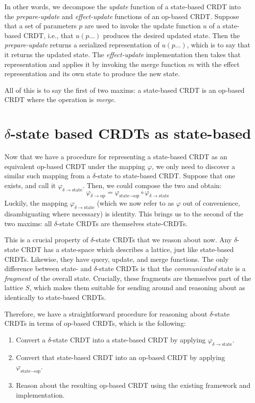 In other words, we decompose the \textit{update} function of a state-based CRDT
into the \textit{prepare-update} and \textit{effect-update} functions of an
op-based CRDT. Suppose that a set of parameters $p$ are used to invoke the
update function $u$ of a state-based CRDT, i.e., that $u(p...)$ produces the
desired updated state. Then the \textit{prepare-update} returns a serialized
representation of $u(p...)$, which is to say that it returns the updated state.
The \textit{effect-update} implementation then takes that representation and
applies it by invoking the merge function $m$ with the effect representation and
its own state to produce the new state.

All of this is to say the first of two maxims: a state-based CRDT is an op-based
CRDT where the operation is \emph{merge}.

\section{$\delta$-state based CRDTs as state-based}
Now that we have a procedure for representing a state-based CRDT as an
equivalent op-based CRDT under the mapping $\varphi$, we only need to discover a
similar such mapping from a $\delta$-state to state-based CRDT. Suppose that one
exists, and call it $\varphi_{\delta \to \text{state}}$. Then, we could compose
the two and obtain:
\[
  \varphi_{\delta \to \text{op}} =
    \varphi_{\text{state} \to \text{op}} \circ
    \varphi_{\delta \to \text{state}}
\]
Luckily, the mapping $\varphi_{\delta \to \text{state}}$ (which we now refer to
as $\varphi$ out of convenience, disambiguating where necessary) is identity.
This brings us to the second of the two maxims: all $\delta$-state CRDTs are
themselves state-CRDTs.

This is a crucial property of $\delta$-state CRDTs that we reason about now. Any
$\delta$-state CRDT has a state-space which describes a lattice, just like
state-based CRDTs. Likewise, they have query, update, and merge functions. The
only difference between state- and $\delta$-state CRDTs is that the
\emph{communicated} state is a \emph{fragment} of the overall state. Crucially,
these fragments are themselves part of the lattice $S$, which makes them
suitable for sending around and reasoning about as identically to state-based
CRDTs.

Therefore, we have a straightforward procedure for reasoning about
$\delta$-state CRDTs in terms of op-based CRDTs, which is the following:
\begin{enumerate}
  \item Convert a $\delta$-state CRDT into a state-based CRDT by applying
    $\varphi_{\delta \to \text{state}}$.
  \item Convert that state-based CRDT into an op-based CRDT by applying
    $\varphi_{\text{state} \to \text{op}}$.
  \item Reason about the resulting op-based CRDT using the existing framework
    and implementation.
\end{enumerate}

